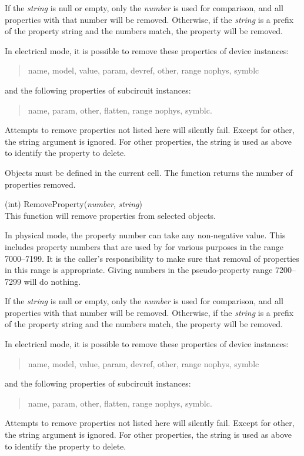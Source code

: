 \begin{description}
If the {\it string} is null or empty, only the {\it number} is used
for comparison, and all properties with that number will be removed. 
Otherwise, if the {\it string} is a prefix of the property string and
the numbers match, the property will be removed.

In electrical mode, it is possible to remove these properties of
device instances:
\begin{quote}
{\et name}, {\et model}, {\et value}, {\et param}, {\et devref},
{\et other}, {\et range} {\et nophys}, {\et symblc}
\end{quote}
and the following properties of subcircuit instances:
\begin{quote}
{\et name}, {\et param}, {\et other}, {\et flatten},
{\et range} {\et nophys}, {\et symblc}.
\end{quote}
Attempts to remove properties not listed here will silently fail. 
Except for {\et other}, the string argument is ignored.  For {\et
other} properties, the string is used as above to identify the
property to delete.

Objects must be defined in the current cell.  The function returns
the number of properties removed.

\item{(int) \vt RemoveProperty({\it number}, {\it string})}\\
This function will remove properties from selected objects.

In physical mode, the property number can take any non-negative value. 
This includes property numbers that are used by {\Xic} for various
purposes in the range 7000--7199.  It is the caller's responsibility
to make sure that removal of properties in this range is appropriate. 
Giving numbers in the pseudo-property range 7200--7299 will do
nothing.

If the {\it string} is null or empty, only the {\it number} is used
for comparison, and all properties with that number will be removed. 
Otherwise, if the {\it string} is a prefix of the property string and
the numbers match, the property will be removed.

In electrical mode, it is possible to remove these properties of
device instances:
\begin{quote}
{\et name}, {\et model}, {\et value}, {\et param}, {\et devref},
{\et other}, {\et range} {\et nophys}, {\et symblc}
\end{quote}
and the following properties of subcircuit instances:
\begin{quote}
{\et name}, {\et param}, {\et other}, {\et flatten},
{\et range} {\et nophys}, {\et symblc}.
\end{quote}
Attempts to remove properties not listed here will silently fail. 
Except for {\et other}, the string argument is ignored.  For {\et
other} properties, the string is used as above to identify the
property to delete.
 

\end{description}
